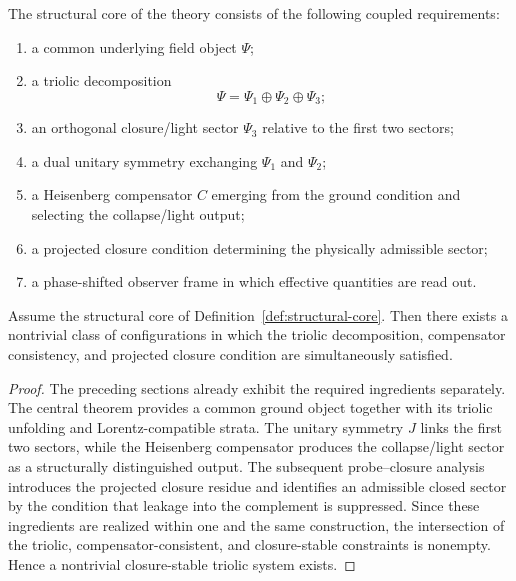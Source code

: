 \begin{definition}
\label{def:structural-core}
The structural core of the theory consists of the following coupled
requirements:
\begin{enumerate}
\item a common underlying field object $\Psi$;
\item a triolic decomposition
\[
  \Psi = \Psi_1\oplus\Psi_2\oplus\Psi_3;
\]
\item an orthogonal closure/light sector $\Psi_3$ relative to the first two
sectors;
\item a dual unitary symmetry exchanging $\Psi_1$ and $\Psi_2$;
\item a Heisenberg compensator $C$ emerging from the ground condition and
selecting the collapse/light output;
\item a projected closure condition determining the physically admissible
sector;
\item a phase-shifted observer frame in which effective quantities are read
out.
\end{enumerate}
\end{definition}

\begin{theorem}
\label{thm:structural-existence}
Assume the structural core of Definition~\ref{def:structural-core}. Then there
exists a nontrivial class of configurations in which the triolic decomposition,
compensator consistency, and projected closure condition are simultaneously
satisfied.
\end{theorem}

\begin{proof}
The preceding sections already exhibit the required ingredients separately.
The central theorem provides a common ground object together with its triolic
unfolding and Lorentz-compatible strata. The unitary symmetry $J$ links the
first two sectors, while the Heisenberg compensator produces the
collapse/light sector as a structurally distinguished output. The subsequent
probe--closure analysis introduces the projected closure residue and identifies
an admissible closed sector by the condition that leakage into the complement
is suppressed. Since these ingredients are realized within one and the same
construction, the intersection of the triolic, compensator-consistent, and
closure-stable constraints is nonempty. Hence a nontrivial closure-stable
triolic system exists.
\end{proof}

